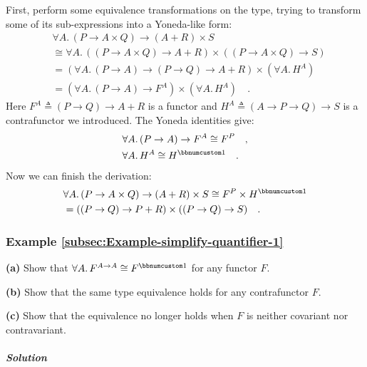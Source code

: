 First, perform some equivalence transformations on the type, trying
to transform some of its sub-expressions into a Yoneda-like form:
\begin{align*}
 & \forall A.\,(P\rightarrow A\times Q)\rightarrow(A+R)\times S\\
 & \cong\forall A.\,((P\rightarrow A\times Q)\rightarrow A+R)\times((P\rightarrow A\times Q)\rightarrow S)\\
 & =(\forall A.\,(P\rightarrow A)\rightarrow(P\rightarrow Q)\rightarrow A+R)\times(\forall A.\,H^{A})\\
 & =(\forall A.\,(P\rightarrow A)\rightarrow F^{A})\times(\forall A.\,H^{A})\quad.
\end{align*}
Here $F^{A}\triangleq(P\rightarrow Q)\rightarrow A+R$ is a functor
and $H^{A}\triangleq(A\rightarrow P\rightarrow Q)\rightarrow S$ is
a contrafunctor we introduced. The Yoneda identities give:
\begin{align*}
 & \forall A.\,(P\rightarrow A)\rightarrow F^{A}\cong F^{P}\quad,\\
 & \forall A.\,H^{A}\cong H^{\bbnum 1}\quad.
\end{align*}
Now we can finish the derivation:
\begin{align*}
 & \forall A.\,(P\rightarrow A\times Q)\rightarrow(A+R)\times S\cong F^{P}\times H^{\bbnum 1}\\
 & =((P\rightarrow Q)\rightarrow P+R)\times((P\rightarrow Q)\rightarrow S)\quad.
\end{align*}


\subsubsection{Example \label{subsec:Example-simplify-quantifier-1}\ref{subsec:Example-simplify-quantifier-1}}

\textbf{(a)} Show that $\forall A.\,F^{A\rightarrow A}\cong F^{\bbnum 1}$
for any functor $F$.

\textbf{(b)} Show that the same type equivalence holds for any contrafunctor
$F$.

\textbf{(c)} Show that the equivalence no longer holds when $F$ is
neither covariant nor contravariant.

\subparagraph{Solution}

